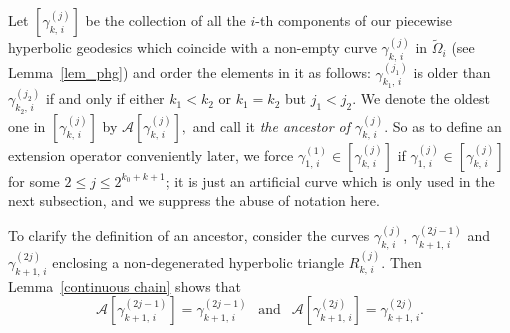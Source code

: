 \documentclass[reqno,11pt]{amsart}
\def\wz{\widetilde}
\numberwithin{equation}{section}
\theoremstyle{remark}
\begin{document}
Let $[\gamma_{k,\,i}^{(j)}]$ be the collection of all the $i$-th components of 
our piecewise hyperbolic geodesics which coincide with a non-empty curve
$\gamma_{k,\,i}^{(j)}$ in $\wz\Omega_i$ (see Lemma~\ref{lem_phg}) and order the 
elements in it as follows: $\gamma_{k_1,\,i}^{(j_1)}$ is older than 
$\gamma_{k_2,\,i}^{(j_2)}$ if and only if either $k_1< k_2$ or $k_1=k_2$ but 
$j_1< j_2$. We denote the oldest one in $[\gamma_{k,\,i}^{(j)}]$ by 
$\mathcal A[\gamma_{k,\,i}^{(j)}],$ and call it 
{\it the ancestor of $\gamma_{k,\,i}^{(j)}$}. So as to define an extension 
operator conveniently later, we force 
$\gamma_{1,\,i}^{(1)}\in [\gamma_{k,\,i}^{(j)}]$ if 
$\gamma_{1,\,i}^{(j)}\in [\gamma_{k,\,i}^{(j)}]$ for some $2\le j\le 2^{k_0+k+1}$; 
it is just an artificial curve which is only used in the next subsection, and 
we suppress the abuse of notation here.  

To clarify the definition of an ancestor, consider the curves $\gamma_{k,\,i}^{(j)}$, $\gamma_{k+1,\,i}^{(2j-1)}$ and 
$\gamma_{k+1,\,i}^{(2j)}$ enclosing a 
non-degenerated hyperbolic triangle $R_{k,\,i}^{(j)}$. Then Lemma~\ref{continuous chain} shows that
\begin{equation}\label{sons}
\mathcal A[\gamma_{k+1,\,i}^{(2j-1)}]= \gamma_{k+1,\,i}^{(2j-1)} \ \ \text{ and } \ \ \mathcal A[\gamma_{k+1,\,i}^{(2j)}]= \gamma_{k+1,\,i}^{(2j)}.
\end{equation}






\end{document}
